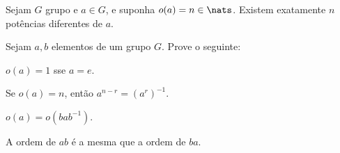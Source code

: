 \begin{exercise}
	Sejam $G$ grupo e $a \in G$, e suponha $o(a) = n \in \nats$. Existem exatamente $n$ potências diferentes de $a$.
\end{exercise}

Sejam $a, b$ elementos de um grupo $G$. Prove o seguinte:

\begin{exercise}
	$o(a) = 1$ sse $a = e$.
\end{exercise}

\begin{exercise}
	Se $o(a) = n$, então $a^{n - r} = (a^r)^{-1}$.	
\end{exercise}

\begin{exercise}
	$o(a) = o(bab^{-1})$.
\end{exercise}

\begin{exercise}
	A ordem de $ab$ é a mesma que a ordem de $ba$.	
\end{exercise}
